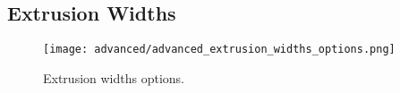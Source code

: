 
\subsection{Extrusion Widths} %
\label{sec:extrusion_widths}

\begin{figure}[H]
\centering
\texttt{[image: advanced/advanced\_extrusion\_widths\_options.png]}
\caption{Extrusion widths options.}
\label{fig:advanced_extrusion_widths_options}
\end{figure}


